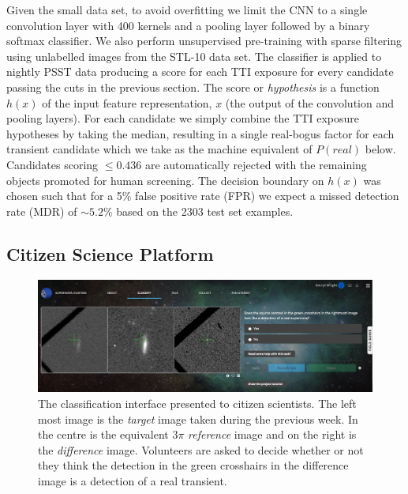 \message{ !name(blank.tex)}\documentclass[a4paper,fleqn,usenatbib]{mnras}
\begin{document}
Given the small data set, to avoid overfitting we limit the CNN to a single convolution layer with 400 kernels and a pooling layer followed by a binary softmax classifier.  We also perform unsupervised pre-training with sparse filtering \citet{Ngiam11} using unlabelled images from the STL-10 \citep{Coates11} data set.  The classifier is applied to nightly PSST data producing a score for each TTI exposure for every candidate passing the cuts in the previous section.  The score or \textit{hypothesis} is a function $h(x)$ of the input feature representation, $x$ (the output of the convolution and pooling layers).  For each candidate we simply combine the TTI exposure hypotheses by taking the median, resulting in a single real-bogus factor for each transient candidate which we take as the machine equivalent of $P(real)$ below.  Candidates scoring $\leq 0.436$ are automatically rejected with the remaining objects promoted for human screening.  The decision boundary on $h(x)$ was chosen such that for a 5\% false positive rate (FPR) we expect a missed detection rate (MDR) of $\sim5.2$\% based on
the 2303 test set examples.

\subsection{Citizen Science Platform}


\begin{figure}
   \begin{minipage}{140mm}
   \includegraphics[width=140mm]{figs/sn_hunters.png}
   \caption{The classification interface presented to citizen scientists.  The left most image is the \textit{target} image taken during the previous week.  In the centre is the equivalent $3\pi$ \textit{reference} image and on the right is the \textit{difference} image.  Volunteers are asked to decide whether or not they think the detection in the green crosshairs in the difference image is a
detection of a real transient.} 
   \label{fig:sn_hunters}
   \end{minipage}
\end{figure}
\end{document}

